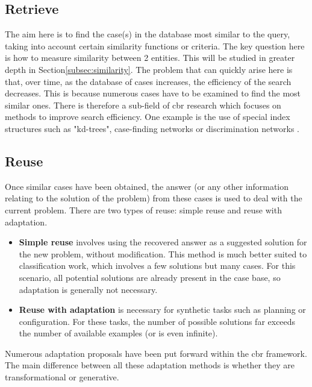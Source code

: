     \subsection{Retrieve}
    The aim here is to find the case(s) in the database most similar to the query, taking into account certain similarity functions or criteria. The key question here is how to measure similarity between 2 entities. This will be studied in greater depth in Section\ref{subsec:similarity}. The problem that can quickly arise here is that, over time, as the database of cases increases, the efficiency of the search decreases. This is because numerous cases have to be examined to find the most similar ones. There is therefore a sub-field of \acrshort{cbr} research which focuses on methods to improve search efficiency. One example is the use of special index structures such as "kd-trees", case-finding networks or discrimination networks \cite{cbrIntroRecent}.
    
    \subsection{Reuse}
    Once similar cases have been obtained, the answer (or any other information relating to the solution of the problem) from these cases is used to deal with the current problem. There are two types of reuse: simple reuse and reuse with adaptation. 
    
    \begin{itemize}
        \item \textbf{Simple reuse} involves using the recovered answer as a suggested solution for the new problem, without modification. This method is much better suited to classification work, which involves a few solutions but many cases.  For this scenario, all potential solutions are already present in the case base, so adaptation is generally not necessary. 
        
        \item \textbf{Reuse with adaptation} is necessary for synthetic tasks such as planning or configuration. For these tasks, the number of possible solutions far exceeds the number of available examples (or is even infinite).
    \end{itemize}

    Numerous adaptation proposals have been put forward within the \acrshort{cbr} framework. The main difference between all these adaptation methods is whether they are transformational or generative.
    
